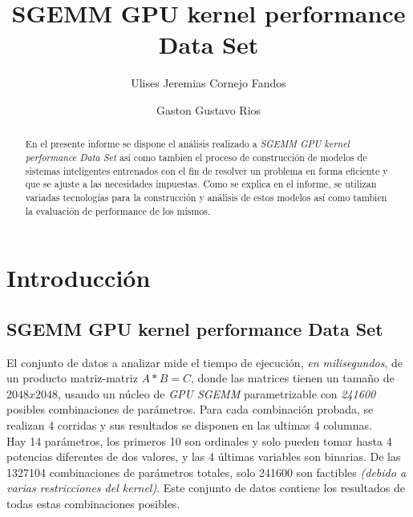 \documentclass[osajnl,twocolumn,showpacs,superscriptaddress,10pt]{revtex4-1} %
\begin{document}
\title{SGEMM GPU kernel performance Data Set}

\author{Ulises Jeremias Cornejo Fandos}

\author{Gaston Gustavo Rios}


\begin{abstract}
En el presente informe se dispone el análisis realizado a \textit{SGEMM GPU kernel performance Data Set} así como tambien el proceso de construcción de modelos de sistemas inteligentes entrenados con el fin de resolver un problema en forma eficiente y que se ajuste a las necesidades impuestas. Como se explica en el informe, se utilizan variadas tecnologías para la construcción y análisis de estos modelos así como tambien la evaluación de performance de los mismos. \\
\end{abstract}

\maketitle %

\section{Introducción}

\subsection{SGEMM GPU kernel performance Data Set}

El conjunto de datos a analizar mide el tiempo de ejecución, \textit{en milisegundos}, de un producto matriz-matriz $A * B = C$, donde las matrices tienen un tamaño de $2048 x 2048$, usando un núcleo de \textit{GPU SGEMM} parametrizable con \textit{241600} posibles combinaciones de parámetros. Para cada combinación probada, se realizan 4 corridas y sus resultados se disponen en las ultimas 4 columnas. \\

Hay 14 parámetros, los primeros 10 son ordinales y solo pueden tomar hasta 4 potencias diferentes de dos valores, y las 4 últimas variables son binarias. De las 1327104 combinaciones de parámetros totales, solo 241600 son factibles \textit{(debido a varias restricciones del kernel)}. Este conjunto de datos contiene los resultados de todas estas combinaciones posibles. \\
\end{document}
